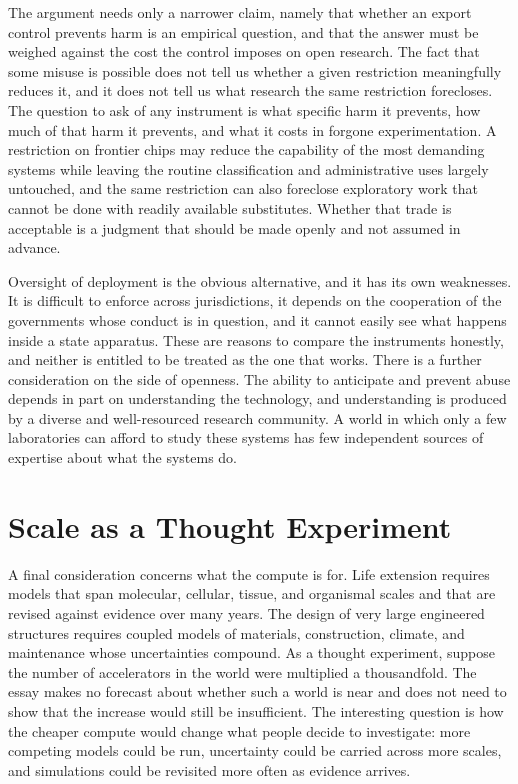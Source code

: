 \documentclass[12pt]{article}
\begin{document}
The argument needs only a narrower claim, namely that whether an export control prevents harm is an empirical question, and that the answer must be weighed against the cost the control imposes on open research. The fact that some misuse is possible does not tell us whether a given restriction meaningfully reduces it, and it does not tell us what research the same restriction forecloses. The question to ask of any instrument is what specific harm it prevents, how much of that harm it prevents, and what it costs in forgone experimentation. A restriction on frontier chips may reduce the capability of the most demanding systems while leaving the routine classification and administrative uses largely untouched, and the same restriction can also foreclose exploratory work that cannot be done with readily available substitutes. Whether that trade is acceptable is a judgment that should be made openly and not assumed in advance.

Oversight of deployment is the obvious alternative, and it has its own weaknesses. It is difficult to enforce across jurisdictions, it depends on the cooperation of the governments whose conduct is in question, and it cannot easily see what happens inside a state apparatus. These are reasons to compare the instruments honestly, and neither is entitled to be treated as the one that works. There is a further consideration on the side of openness. The ability to anticipate and prevent abuse depends in part on understanding the technology, and understanding is produced by a diverse and well-resourced research community. A world in which only a few laboratories can afford to study these systems has few independent sources of expertise about what the systems do.

\section{Scale as a Thought Experiment}

A final consideration concerns what the compute is for. Life extension requires models that span molecular, cellular, tissue, and organismal scales and that are revised against evidence over many years. The design of very large engineered structures requires coupled models of materials, construction, climate, and maintenance whose uncertainties compound. As a thought experiment, suppose the number of accelerators in the world were multiplied a thousandfold. The essay makes no forecast about whether such a world is near and does not need to show that the increase would still be insufficient. The interesting question is how the cheaper compute would change what people decide to investigate: more competing models could be run, uncertainty could be carried across more scales, and simulations could be revisited more often as evidence arrives.
\end{document}
